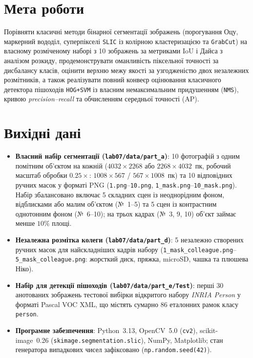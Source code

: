 \documentclass[14pt, a4paper]{extarticle}
\begin{document}


\section{Мета роботи}
Порівняти класичні методи бінарної сегментації зображень (порогування Оцу, маркерний вододіл, суперпікселі \texttt{SLIC} із колірною кластеризацією та \texttt{GrabCut}) на власному розміченому наборі з 10 зображень за метриками $\text{IoU}$ і Дайса з аналізом розкиду, продемонструвати оманливість піксельної точності за дисбалансу класів, оцінити верхню межу якості за узгодженістю двох незалежних розмітників, а також реалізувати повний конвеєр оцінювання класичного детектора пішоходів \texttt{HOG+SVM} із власним немаксимальним придушенням (\texttt{NMS}), кривою \emph{precision--recall} та обчисленням середньої точності ($\text{AP}$).

\section{Вихідні дані}
\begin{itemize}
    \item \textbf{Власний набір сегментації (\texttt{lab07/data/part\_a})}: 10 фотографій з одним помітним об'єктом на кожній ($4032 \times 2268$ або $2268 \times 4032$~пк, робочий масштаб обробки $0.25\times$: $1008 \times 567$ / $567 \times 1008$~пк) та 10 відповідних ручних масок у форматі PNG (\texttt{1.png}--\texttt{10.png}, \texttt{1\_mask.png}--\texttt{10\_mask.png}). Набір збалансовано включає 5 складних сцен із неоднорідним фоном, відблисками або малим об'єктом (№~1--5) та 5 сцен із контрастним однотонним фоном (№~6--10); на трьох кадрах (№~3, 9, 10) об'єкт займає менше $10\%$ площі.
    \item \textbf{Незалежна розмітка колеги (\texttt{lab07/data/part\_d})}: 5 незалежно створених ручних масок для найскладніших кадрів набору (\texttt{1\_mask\_colleague.png}--\texttt{5\_mask\_colleague.png}: жорсткий диск, пряжка, microSD, чашка та плюшева Ніко).
    \item \textbf{Набір для детекції пішоходів (\texttt{lab07/data/part\_e/Test})}: перші 30 анотованих зображень тестової вибірки відкритого набору \emph{INRIA Person} у форматі Pascal VOC XML, що містять сумарно $86$ еталонних рамок класу \texttt{person}.
    \item \textbf{Програмне забезпечення}: Python~3.13, OpenCV~5.0 (\texttt{cv2}), scikit-image~0.26 (\texttt{skimage.segmentation.slic}), NumPy, Matplotlib; стан генератора випадкових чисел зафіксовано (\texttt{np.random.seed(42)}).
\end{itemize}
\end{document}
